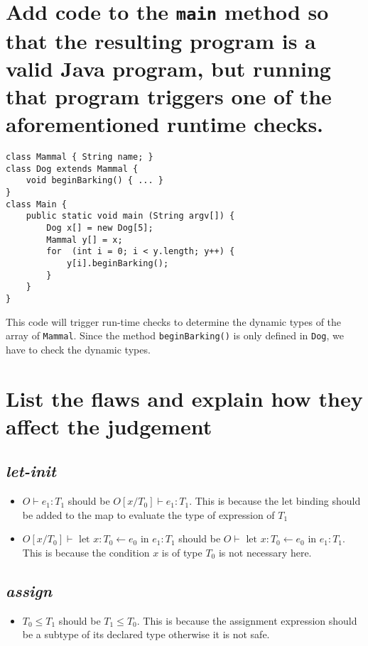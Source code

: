 \documentclass[11pt]{article}
\begin{document}
\section{Add code to the \lstinline|main| method so that the resulting program is a valid Java program, but running that program triggers one of the aforementioned runtime checks.}
\begin{lstlisting}
class Mammal { String name; }
class Dog extends Mammal {
	void beginBarking() { ... }
}
class Main {
	public static void main (String argv[]) {
		Dog x[] = new Dog[5];
		Mammal y[] = x;
		for  (int i = 0; i < y.length; y++) {
			y[i].beginBarking();
		}
	}
}
\end{lstlisting}
This code will trigger run-time checks to determine the dynamic types of the array of \lstinline|Mammal|. Since the method \lstinline|beginBarking()| is only defined in \lstinline|Dog|, we have to check the dynamic types.

\setcounter{subsection}{0}

\section{List the flaws and explain how they affect the judgement}
\subsection{\textit{let-init}}
\begin{itemize}
\item $O \vdash e_{1} : T_{1}$ should be $O[x/T_{0}] \vdash e_{1} : T_{1}$. This is because the let binding should be added to the map to evaluate the type of expression of $T_{1}$
\item $O[x/T_{0}] \vdash \text{ let } x : T_{0} \leftarrow e_{0} \text{ in } e_{1} : T_{1}$ should be $O \vdash \text{ let } x : T_{0} \leftarrow e_{0} \text{ in } e_{1} : T_{1}$. This is because the condition $x$ is of type $T_{0}$ is not necessary here.
\end{itemize}

\subsection{\textit{assign}}
\begin{itemize}
\item $T_{0} \le T_{1}$ should be $T_{1} \le T_{0}$. This is because the assignment expression should be a subtype of its declared type otherwise it is not safe.  
\end{itemize}
\end{document}
